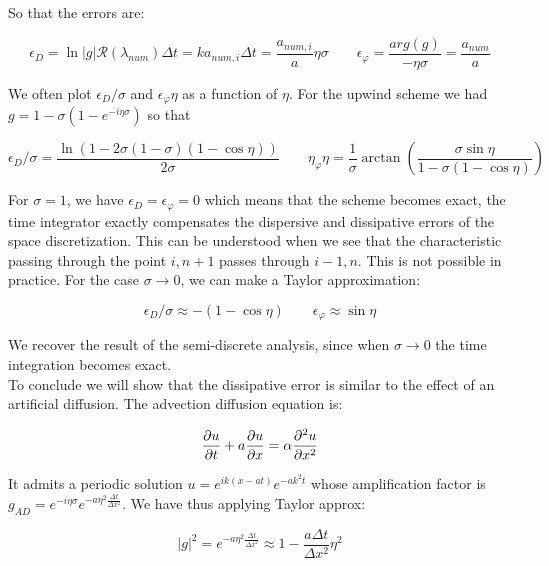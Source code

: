 So that the errors are: 

\begin{equation}
\epsilon _D = \ln |g| \mathcal{R}(\lambda _{num}) \Delta t = k a_{num,i} \Delta t=  \frac{a_{num,i}}{a}\eta \sigma \qquad \epsilon _{\varphi} = \frac{arg(g)}{-\eta \sigma} = \frac{a_{num}}{a} 
\end{equation}

We often plot $\epsilon _D/\sigma$ and $\epsilon _\varphi \eta$ as a function of $\eta$. For the upwind scheme we had $g = 1 - \sigma (1 - e^{-i\eta \sigma})$ so that 

\begin{equation}
\epsilon _D / \sigma = \frac{\ln (1 - 2 \sigma (1- \sigma )(1-\cos \eta))}{2\sigma } \qquad \eta _\varphi \eta = \frac{1}{\sigma} \arctan \left( \frac{\sigma \sin \eta }{1 -\sigma (1- \cos \eta)} \right)
\end{equation}

For $\sigma = 1$, we have $\epsilon _D = \epsilon _\varphi = 0$ which means that the scheme becomes exact, the time integrator exactly compensates the dispersive and dissipative errors of the space discretization. This can be understood  when we see that the characteristic passing through the point $i, n+1$ passes through $i-1,n$. This is not possible in practice. For the case $\sigma \rightarrow 0$, we can make a Taylor approximation: 

\begin{equation}
\epsilon _D /\sigma \approx -(1 - \cos \eta) \qquad \epsilon _\varphi \approx \sin \eta
\end{equation}

We recover the result of the semi-discrete analysis, since when $\sigma \rightarrow 0$ the time integration becomes exact. \\

To conclude we will show that the dissipative error is similar to the effect of an artificial diffusion. The advection diffusion equation is: 

\begin{equation}
\frac{\partial u}{\partial t} + a \frac{\partial u }{\partial x} = \alpha \frac{\partial ^2 u}{\partial x^2}
\end{equation}

It admits a periodic solution $u = e^{ik(x-at)}e^{-ak^2 t}$ whose amplification factor is $g_{AD} = e^{-i\eta \sigma}e^{-a \eta ^2 \frac{\Delta t}{\Delta x^2}}$. We have thus applying Taylor approx: 

\begin{equation}
|g|^2 = e^{-a \eta ^2 \frac{\Delta t}{\Delta x^2}} \approx 1 - \frac{a\Delta t}{\Delta x^2} \eta ^2 
\end{equation}

